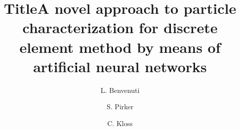 


\title{Title}

\title{A novel approach to particle characterization for discrete element method by means of artificial neural networks}


\author[JKU PFM]{L. Benvenuti }

\author[JKU PFM]{S. Pirker}

\address[JKU PFM]{JKU Department of Particulate Flow Modelling - Linz}




\author[DCS]{C. Kloss}
\address[DCS]{DCS Computing - Linz}

